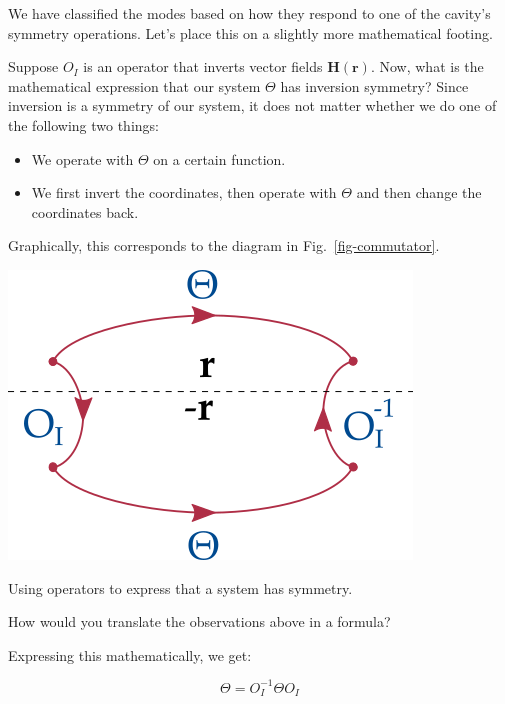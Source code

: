 We have classified the modes based on how they respond to one of the cavity's symmetry operations. Let's place this on a slightly more mathematical footing. 

Suppose $O_I$ is an operator that inverts vector fields ${\mathbf H({\mathbf r})}$. Now, what is the mathematical expression that our system $\Theta$ has inversion symmetry? Since inversion is a symmetry of our system, it does not matter whether we do one of the following two things:

\begin{itemize}
\item
 We operate with $\Theta$ on a certain function.
\item
\noindent{}We first invert the coordinates, then operate with $\Theta$ and then change the coordinates back.
\end{itemize}

Graphically, this corresponds to the diagram in Fig.~\ref{fig-commutator}.

\begin{marginfigure}[1.0cm]
 \includegraphics{symmetry/figures/commutator}
 \caption{Using operators to express that a system has symmetry.}
 \label{fig-commutator} 
\end{marginfigure}

\begin{cue}
How would you translate the observations above in a formula?
\end{cue}

Expressing this mathematically, we get:

\begin{equation}
  \Theta = O_I^{-1} \Theta O_I
  \label{eq-operator-symmetry}
\end{equation} 

